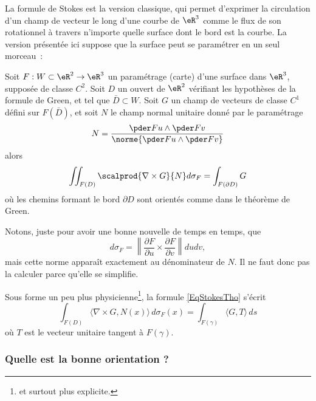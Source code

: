 La formule de Stokes est la version classique, qui permet d'exprimer la circulation d'un champ de vecteur le long d'une courbe de \( \eR^3\) comme le flux de son rotationnel à travers n'importe quelle surface dont le bord est la courbe. La version présentée ici suppose que la surface peut se paramétrer en un seul morceau~:
\begin{theorem}      \label{THOooDCPKooMqNOMU}
	Soit \( F : W\subset \eR^2 \to \eR^3\) un paramétrage (carte) d'une surface dans \( \eR^3\), supposée de classe \( C^2\). Soit \( D\) un ouvert de \( \eR^2\) vérifiant les hypothèses de la formule de Green, et tel que \( \bar D \subset W\). Soit \( G\) un champ de vecteurs de classe \( C^1\) défini sur \( F(\bar D)\), et soit \( N\) le champ normal unitaire donné par le paramétrage
	\begin{equation}
		N = \frac{\pder F u \wedge \pder F v}{\norme{\pder F u \wedge \pder F v}}
	\end{equation}
	alors
	\begin{equation}\label{EqStokesTho}
		\iint_{F(D)} \scalprod{\nabla\times G}{N} d\sigma_F = \int_{F(\partial D)} G
	\end{equation}
	où les chemins formant le bord \( \partial D\) sont orientés comme dans le théorème de Green.
\end{theorem}
Notons, juste pour avoir une bonne nouvelle de temps en temps, que
\begin{equation}
	d\sigma_F=\left\| \frac{ \partial F }{ \partial u }\times\frac{ \partial F }{ \partial v }  \right\|dudv,
\end{equation}
mais cette norme apparaît exactement au dénominateur de \( N\). Il ne faut donc pas la calculer parce qu'elle se simplifie.

Sous forme un peu plus physicienne\footnote{et surtout plus explicite.}, la formule \eqref{EqStokesTho} s'écrit
\begin{equation}
	\int_{F(D)}\langle \nabla\times G, N(x)\rangle\, d\sigma_F(x)=\int_{F(\gamma)}\langle G, T\rangle\, ds
\end{equation}
où \( T\) est le vecteur unitaire tangent à \( F(\gamma)\).

\subsubsection{Quelle est la bonne orientation ?}

